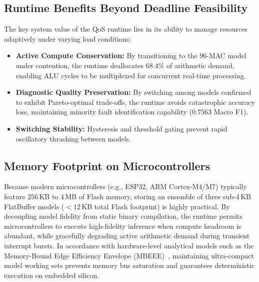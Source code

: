\documentclass[journal]{IEEEtran}
\begin{document}
\subsection{Runtime Benefits Beyond Deadline Feasibility}
The key system value of the QoS runtime lies in its ability to manage resources adaptively under varying load conditions:
\begin{itemize}
    \item \textbf{Active Compute Conservation:} By transitioning to the 96-MAC model under contention, the runtime deallocates $68.4\%$ of arithmetic demand, enabling ALU cycles to be multiplexed for concurrent real-time processing.
    \item \textbf{Diagnostic Quality Preservation:} By switching among models confirmed to exhibit Pareto-optimal trade-offs, the runtime avoids catastrophic accuracy loss, maintaining minority fault identification capability ($0.7563$ Macro F1).
    \item \textbf{Switching Stability:} Hysteresis and threshold gating prevent rapid oscillatory thrashing between models.
\end{itemize}

\subsection{Memory Footprint on Microcontrollers}
Because modern microcontrollers (e.g., ESP32, ARM Cortex-M4/M7) typically feature $256$\,KB to $4$\,MB of Flash memory, storing an ensemble of three sub-4\,KB FlatBuffer models ($<12$\,KB total Flash footprint) is highly practical. By decoupling model fidelity from static binary compilation, the runtime permits microcontrollers to execute high-fidelity inference when compute headroom is abundant, while gracefully degrading active arithmetic demand during transient interrupt bursts. In accordance with hardware-level analytical models such as the Memory-Bound Edge Efficiency Envelope (MBEEE)~\cite{narendra2026mbeee}, maintaining ultra-compact model working sets prevents memory bus saturation and guarantees deterministic execution on embedded silicon.
\end{document}
